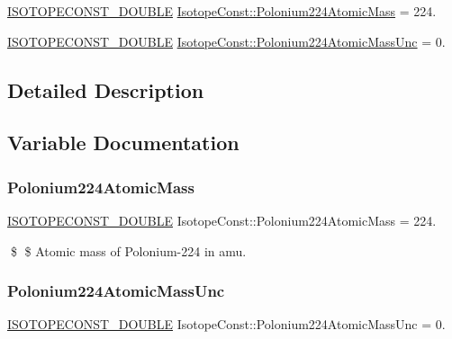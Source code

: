 \begin{DoxyCompactItemize}
\item 
\mbox{\hyperlink{group___isotope_const-_macros_ga8f45a7272ce02c0b4c65c44636ed719a}{I\+S\+O\+T\+O\+P\+E\+C\+O\+N\+S\+T\+\_\+\+D\+O\+U\+B\+LE}} \mbox{\hyperlink{group___isotope_const-_polonium-_po224_ga06bfbc28cc4fe7408c0d84b21558559f}{Isotope\+Const\+::\+Polonium224\+Atomic\+Mass}} = 224.
\item 
\mbox{\hyperlink{group___isotope_const-_macros_ga8f45a7272ce02c0b4c65c44636ed719a}{I\+S\+O\+T\+O\+P\+E\+C\+O\+N\+S\+T\+\_\+\+D\+O\+U\+B\+LE}} \mbox{\hyperlink{group___isotope_const-_polonium-_po224_ga4763d2ff0456ba11984eceaf6f6ab16f}{Isotope\+Const\+::\+Polonium224\+Atomic\+Mass\+Unc}} = 0.
\end{DoxyCompactItemize}


\subsection{Detailed Description}


\subsection{Variable Documentation}
\mbox{\label{group___isotope_const-_polonium-_po224_ga06bfbc28cc4fe7408c0d84b21558559f}} 
\subsubsection{\texorpdfstring{Polonium224\+Atomic\+Mass}{Polonium224AtomicMass}}
{\footnotesize\ttfamily \mbox{\hyperlink{group___isotope_const-_macros_ga8f45a7272ce02c0b4c65c44636ed719a}{I\+S\+O\+T\+O\+P\+E\+C\+O\+N\+S\+T\+\_\+\+D\+O\+U\+B\+LE}} Isotope\+Const\+::\+Polonium224\+Atomic\+Mass = 224.}

\$ \$ Atomic mass of Polonium-\/224 in amu. \mbox{\label{group___isotope_const-_polonium-_po224_ga4763d2ff0456ba11984eceaf6f6ab16f}} 
\subsubsection{\texorpdfstring{Polonium224\+Atomic\+Mass\+Unc}{Polonium224AtomicMassUnc}}
{\footnotesize\ttfamily \mbox{\hyperlink{group___isotope_const-_macros_ga8f45a7272ce02c0b4c65c44636ed719a}{I\+S\+O\+T\+O\+P\+E\+C\+O\+N\+S\+T\+\_\+\+D\+O\+U\+B\+LE}} Isotope\+Const\+::\+Polonium224\+Atomic\+Mass\+Unc = 0.}

